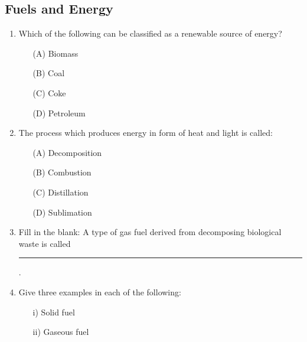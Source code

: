 \subsection{Fuels and Energy}

\begin{enumerate}
	\item Which of the following can be classified as a renewable source of energy? 
	\begin{enumerate}[topsep=0ex,itemsep=0ex,partopsep=1ex,parsep=1ex]
		\item[(A)] Biomass
		\item[(B)] Coal
		\item[(C)] Coke
		\item[(D)] Petroleum
	\end{enumerate}
		
	\item The process which produces energy in form of heat and light is called:
	\begin{enumerate}[topsep=0ex,itemsep=0ex,partopsep=1ex,parsep=1ex]
		\item[(A)] Decomposition
		\item[(B)] Combustion
		\item[(C)] Distillation
		\item[(D)] Sublimation
	\end{enumerate}
	
	\item Fill in the blank: A type of gas fuel derived from decomposing biological waste is called \rule{1.5cm}{0.15mm}.
	
	\item Give three examples in each of the following: 
	\begin{enumerate}
		\item[i)] Solid fuel
		\item[ii)] Gaseous fuel
	\end{enumerate}
	
\end{enumerate}














